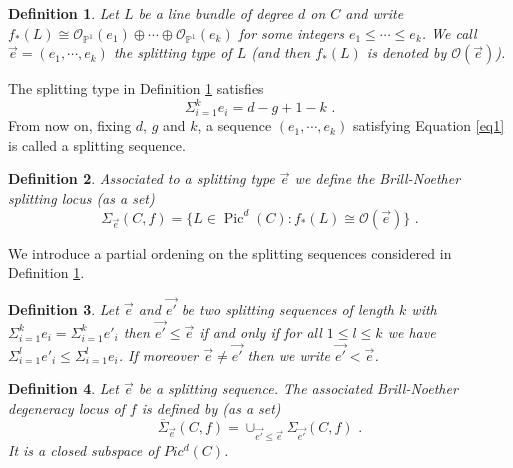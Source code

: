 \documentclass{article}
\DeclareMathOperator{\Pic}{Pic}
\newtheorem{definition}{Definition}
\theoremstyle{definition}
\theoremstyle{remark}
\begin{document}
\begin{definition}\label{def1.1}
Let $L$ be a line bundle of degree $d$ on $C$ and write $f_*(L) \cong \mathcal{O}_{\mathbb{P}^1}(e_1) \oplus \cdots \oplus \mathcal{O}_{\mathbb{P}^1}(e_k)$ for some integers $e_1 \leq \cdots \leq e_k$.
We call $\overrightarrow {e}=(e_1, \cdots , e_k)$ the splitting type of $L$ (and then $f_*(L)$ is denoted by $\mathcal{O}(\overrightarrow {e})$).
\end{definition}

The splitting type in Definition \ref{def1.1} satisfies
\begin{equation}\label{eq1}
\Sigma_{i=1}^k e_i=d-g+1-k \text { .}
\end{equation}
From now on, fixing $d$, $g$ and $k$, a sequence $(e_1 , \cdots , e_k)$ satisfying Equation \ref{eq1} is called a splitting sequence.

\begin{definition}\label{def1.2}
Associated to a splitting type $\overrightarrow {e}$ we define the Brill-Noether splitting locus (as a set)
\[
\Sigma _{\overrightarrow {e}}(C,f)=\{ L \in \Pic^d(C) : f_*(L) \cong \mathcal{O}(\overrightarrow {e}) \} \text { .}
\]
\end{definition}

We introduce a partial ordening on the splitting sequences considered in Definition \ref{def1.1}.
\begin{definition}\label{def1.3}
Let $\overrightarrow {e}$ and $\overrightarrow {e'}$ be two splitting sequences of length $k$ with $\Sigma_{i=1}^k e_i=\Sigma_{i=1}^k e'_i$ then $\overrightarrow {e'} \leq \overrightarrow {e}$ if and only if for all $1 \leq l \leq k$ we have $\Sigma_{i=1}^l e'_i \leq \Sigma_{i=1}^l e_i$.
If moreover $\overrightarrow{e} \neq \overrightarrow {e'}$ then we write $\overrightarrow {e'}<\overrightarrow {e}$.
\end{definition}

\begin{definition}\label{def1.4}
Let $\overrightarrow {e}$ be a splitting sequence.
The associated Brill-Noether degeneracy locus of $f$ is defined by (as a set)
\[
\overline{\Sigma}_{\overrightarrow {e}}(C,f)= \cup_{\overrightarrow {e'} \leq \overrightarrow {e}}\Sigma_{\overrightarrow {e'}}(C,f) \text { .}
\]
It is a closed subspace of $Pic^d(C)$.
\end{definition}
\end{document}
